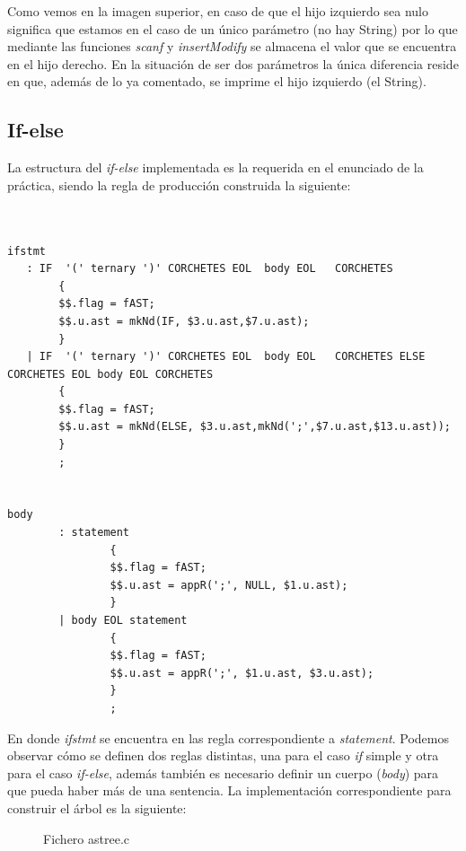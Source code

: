 \documentclass[11pt]{article}
\begin{document}
\noindent Como vemos en la imagen superior, en caso de que el hijo izquierdo sea nulo significa que estamos en el caso de un único parámetro (no hay String) por lo que mediante las funciones \textit{scanf} y \textit{insertModify} se almacena el valor que se encuentra en el hijo derecho. En la situación de ser dos parámetros la única diferencia reside en que, además de lo ya comentado, se imprime el hijo izquierdo (el String).


\newpage

\subsection{If-else}

\noindent La estructura del \textit{if-else} implementada es la requerida en el enunciado de la práctica, siendo la regla de producción construida la siguiente:

\begin{verbatim}


ifstmt
   : IF  '(' ternary ')' CORCHETES EOL  body EOL   CORCHETES
        {
        $$.flag = fAST;
        $$.u.ast = mkNd(IF, $3.u.ast,$7.u.ast);
        }
   | IF  '(' ternary ')' CORCHETES EOL  body EOL   CORCHETES ELSE CORCHETES EOL body EOL CORCHETES
        {
        $$.flag = fAST;
        $$.u.ast = mkNd(ELSE, $3.u.ast,mkNd(';',$7.u.ast,$13.u.ast));
        }
        ;
        

body
        : statement
                {
                $$.flag = fAST;
                $$.u.ast = appR(';', NULL, $1.u.ast);
                }
        | body EOL statement
                {
                $$.flag = fAST;
                $$.u.ast = appR(';', $1.u.ast, $3.u.ast);
                }
                ;

\end{verbatim}

\noindent En donde \textit{ifstmt} se encuentra en las regla correspondiente a \textit{statement}. Podemos observar cómo se definen dos reglas distintas, una para el caso \textit{if} simple y otra para el caso \textit{if-else}, además también es necesario definir un cuerpo (\textit{body}) para que pueda haber más de una sentencia. La implementación correspondiente para construir el árbol es la siguiente:

\begin{figure}[H]
  \centering
  \caption{Fichero astree.c}
\end{figure}
\end{document}
